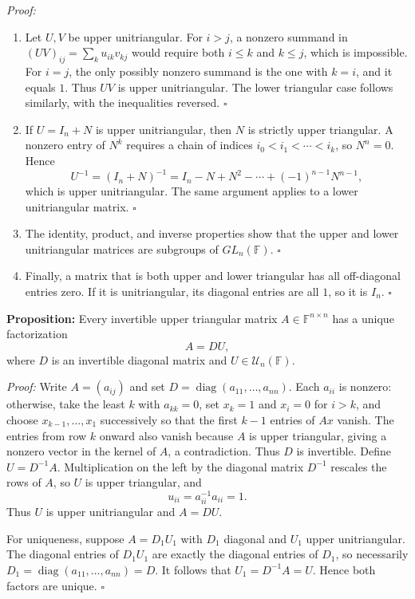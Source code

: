 \documentclass[a4paper,11pt,abstract=true]{scrartcl}
\theoremstyle{dotlessP}
\theoremstyle{dotlessS}
\theoremstyle{remark}
\theoremstyle{definition}
\begin{document}
\begin{claim_box}
\textit{Proof:}
\begin{enumerate}
\item Let $U,V$ be upper unitriangular. For $i>j$, a
nonzero summand in $(UV)_{ij}=\sum_k u_{ik}v_{kj}$ would require both
$i\leq k$ and $k\leq j$, which is impossible. For $i=j$, the only
possibly nonzero summand is the one with $k=i$, and it equals $1$.
Thus $UV$ is upper unitriangular. The lower triangular case follows
similarly, with the inequalities reversed.
\hfill$\square$
\item If $U=I_n+N$ is upper unitriangular, then $N$ is strictly upper
triangular. A nonzero entry of $N^k$ requires a chain of indices
$i_0<i_1<\cdots<i_k$, so $N^n=0$. Hence
\[
U^{-1}=(I_n+N)^{-1}=I_n-N+N^2-\cdots+(-1)^{n-1}N^{n-1},
\]
which is upper unitriangular. The same argument applies to a lower
unitriangular matrix.
\hfill$\square$
\item The identity, product, and inverse properties show that the
upper and lower unitriangular matrices are subgroups of
$GL_n(\mathbb{F})$.
\hfill$\square$
\item Finally, a matrix that is both upper and lower triangular has all
off-diagonal entries zero. If it is unitriangular, its diagonal entries
are all $1$, so it is $I_n$.
\hfill$\square$
\end{enumerate}
\end{claim_box}

\begin{problem_box}
\textbf{Proposition:} Every invertible upper triangular matrix
$A\in\mathbb{F}^{n\times n}$ has a unique factorization
\[
A=DU,
\]
where $D$ is an invertible diagonal matrix and
$U\in\mathcal{U}_n(\mathbb{F})$.
\end{problem_box}

\begin{claim_box}
\textit{Proof:} Write $A=(a_{ij})$ and set
$D=\operatorname{diag}(a_{11},\ldots,a_{nn})$. Each $a_{ii}$ is
nonzero: otherwise, take the least $k$ with $a_{kk}=0$, set $x_k=1$
and $x_i=0$ for $i>k$, and choose $x_{k-1},\ldots,x_1$ successively
so that the first $k-1$ entries of $Ax$ vanish. The entries from row
$k$ onward also vanish because $A$ is upper triangular, giving a
nonzero vector in the kernel of $A$, a contradiction. Thus $D$ is
invertible. Define $U=D^{-1}A$. Multiplication on the left
by the diagonal matrix $D^{-1}$ rescales the rows of $A$, so $U$ is
upper triangular, and
\[
u_{ii}=a_{ii}^{-1}a_{ii}=1.
\]
Thus $U$ is upper unitriangular and $A=DU$.

For uniqueness, suppose $A=D_1U_1$ with $D_1$ diagonal and $U_1$
upper unitriangular. The diagonal entries of $D_1U_1$ are exactly the
diagonal entries of $D_1$, so necessarily
$D_1=\operatorname{diag}(a_{11},\ldots,a_{nn})=D$. It follows that
$U_1=D^{-1}A=U$. Hence both factors are unique. \hfill$\square$
\end{claim_box}
\end{document}
